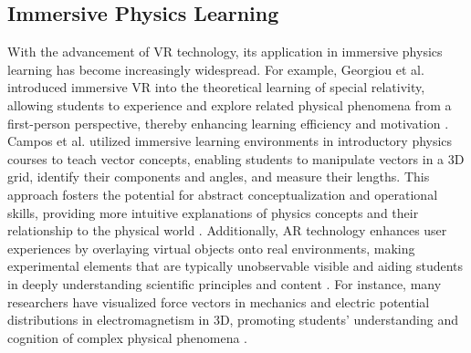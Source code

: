 \subsection{Immersive Physics Learning}
With the advancement of VR technology, its application in immersive physics learning has become increasingly widespread. For example, Georgiou et al. introduced immersive VR into the theoretical learning of special relativity, allowing students to experience and explore related physical phenomena from a first-person perspective, thereby enhancing learning efficiency and motivation \cite{georgiou2021learning}. Campos et al. utilized immersive learning environments in introductory physics courses to teach vector concepts, enabling students to manipulate vectors in a 3D grid, identify their components and angles, and measure their lengths. This approach fosters the potential for abstract conceptualization and operational skills, providing more intuitive explanations of physics concepts and their relationship to the physical world \cite{campos2022impact}. Additionally, AR technology enhances user experiences by overlaying virtual objects onto real environments, making experimental elements that are typically unobservable visible and aiding students in deeply understanding scientific principles and content \cite{pegrum2021augmented,prahani2022trend}. For instance, many researchers have visualized force vectors in mechanics and electric potential distributions in electromagnetism in 3D, promoting students' understanding and cognition of complex physical phenomena \cite{al2020effectiveness,teichrew2020augmented,ismail2019enhancing,boettcher2021using}.

